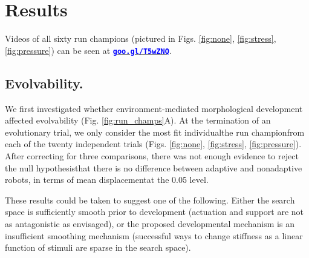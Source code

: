\section{Results}
\label{sec:results}


Videos of all sixty run champions (pictured in Figs. \ref{fig:none}, \ref{fig:stress}, \ref{fig:pressure}) can be seen at
\href{https://www.youtube.com/playlist?list=PL7qssg0uLKTaFhaCRC0WviaGeOitOE8MR}{\textcolor{blue}{\textbf{\texttt{goo.gl/T5wZNQ}}}}.


\subsection{Evolvability.}

We first investigated whether environment-mediated morphological development affected evolvability (Fig. \ref{fig:run_champs}A).
At the termination of an evolutionary trial, we only consider the most fit individual{\textemdash}the run champion{\textemdash}from each of the twenty independent trials (Figs. \ref{fig:none}, \ref{fig:stress}, \ref{fig:pressure}).
After correcting for three comparisons, there was not enough evidence to reject the null hypothesis{\textemdash}that there is no difference between adaptive and nonadaptive robots, in terms of mean displacement{\textemdash}at the 0.05 level.

These results could be taken to suggest one of the following. 
Either the search space is sufficiently smooth prior to development (actuation and support are not as antagonistic as envisaged), or the proposed developmental mechanism is an insufficient smoothing 
mechanism
(successful ways to change stiffness as a linear function of stimuli are sparse in the search space).


